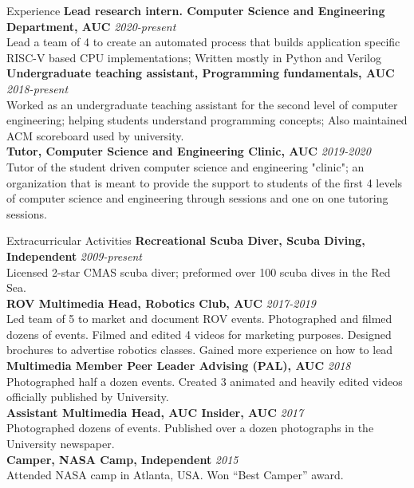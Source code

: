 \documentclass{resume}
\begin{document}
\begin{small}
	\begin{rSection}{Experience}
		{\bf Lead research intern. Computer Science and Engineering Department, AUC} \hfill {\em 2020-present} \\
		Lead a team of 4 to create an automated process that builds application specific RISC-V based CPU implementations; Written mostly in Python and Verilog \\
		{\bf Undergraduate teaching assistant, Programming fundamentals, AUC} \hfill {\em 2018-present} \\
		Worked as an undergraduate teaching assistant for the second level of computer engineering; helping students understand programming concepts; Also maintained ACM scoreboard used by university. \\
		{\bf Tutor, Computer Science and Engineering Clinic, AUC} \hfill {\em 2019-2020} \\
		Tutor of the student driven computer science and engineering "clinic"; an organization that is meant to provide the support to students of the first 4 levels of computer science and engineering through sessions and one on one tutoring sessions.
	\end{rSection}
	\begin{rSection} {Extracurricular Activities}
		{\bf Recreational Scuba Diver, Scuba Diving, Independent} \hfill {\em 2009-present}\\
		Licensed 2-star CMAS scuba diver; preformed over 100 scuba dives in the Red Sea.\\
		{\bf ROV Multimedia Head, Robotics Club, AUC} \hfill {\em 2017-2019} \\
		Led team of 5 to market and document ROV events. Photographed and filmed dozens of events. Filmed and edited 4 videos for marketing purposes. Designed brochures to advertise robotics classes. Gained more experience on how to lead\\
		{\bf Multimedia Member Peer Leader Advising (PAL), AUC} \hfill {\em 2018}\\
		Photographed half a dozen events. Created 3 animated and heavily edited videos officially published by University.\\
		{\bf Assistant Multimedia Head, AUC Insider, AUC} \hfill {\em 2017}\\
		Photographed dozens of events. Published over a dozen photographs in the University newspaper.\\
		{\bf Camper, NASA Camp, Independent} \hfill {\em 2015}\\
		Attended NASA camp in Atlanta, USA. Won “Best Camper” award.\\
		

\end{rSection}
\end{small}
\end{document}
